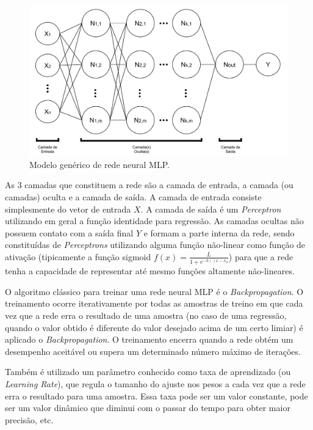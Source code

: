 \documentclass[12pt]{article}
\begin{document}
            \begin{figure}[H]
            \centering
            \includegraphics[width=16cm]{images/MLP.png}\par
            \caption{Modelo genérico de rede neural MLP.}
            \label{fig:MLP}
            \end{figure}
            
            As 3 camadas que constituem a rede são a camada de entrada, a camada (ou camadas) oculta e a camada de saída. A camada de entrada consiste simplesmente do vetor de entrada $X$. A camada de saída é um \textit{Perceptron} utilizando em geral a função identidade para regressão. As camadas ocultas não possuem contato com a saída final $Y$ e formam a parte interna da rede, sendo constituídas de \textit{Perceptrons} utilizando alguma função não-linear como função de ativação (tipicamente a função sigmoid $ f(x) = \frac{L}{1+e^{-k()x-x_0}} $) para que a rede tenha a capacidade de representar até mesmo funções altamente não-lineares.
            
            O algoritmo clássico para treinar uma rede neural MLP é o \textit{Backpropagation}. O treinamento ocorre iterativamente por todas as amostras de treino em que cada vez que a rede erra o resultado de uma amostra (no caso de uma regressão, quando o valor obtido é diferente do valor desejado acima de um certo limiar) é aplicado o \textit{Backpropagation}. O treinamento encerra quando a rede obtém um desempenho aceitável ou supera um determinado número máximo de iterações. 
            
            Também é utilizado um parâmetro conhecido como taxa de aprendizado (ou \textit{Learning Rate}), que regula o tamanho do ajuste nos pesos a cada vez que a rede erra o resultado para uma amostra. Essa taxa pode ser um valor constante, pode ser um valor dinâmico que diminui com o passar do tempo para obter maior precisão, etc.
            
\end{document}
